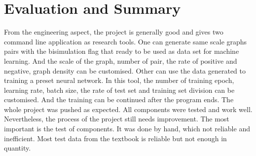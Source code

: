 \section{Evaluation and Summary}
\label{sec:evaluation}



From the engineering aspect, the project is generally good and gives two command line application as research tools.
One can generate same scale graphs pairs with the bisimulation flag that ready to be used as data set for machine learning.
And the scale of the graph, number of pair, the rate of positive and negative, graph density can be customised.
Other can use the data generated to training a preset neural network.
In this tool, the number of training epoch, learning rate, batch size, the rate of test set and training set division can be customised.
And the training can be continued after the program ends.
The whole project was pushed as expected.
All components were tested and work well.
Nevertheless, the process of the project still needs improvement.
The most important is the test of components.
It was done by hand, which not reliable and inefficient.
Most test data from the textbook is reliable but not enough in quantity.


